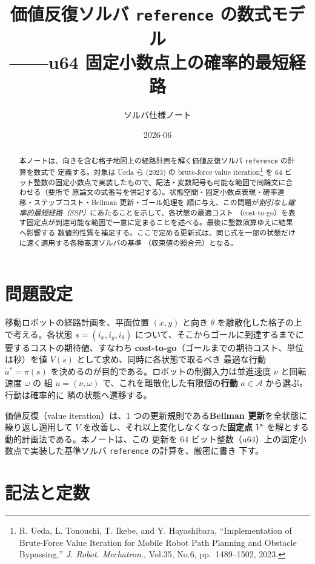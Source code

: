 \documentclass[11pt]{ltjsarticle}
\title{価値反復ソルバ \texttt{reference} の数式モデル\\\large——u64 固定小数点上の確率的最短経路}
\author{ソルバ仕様ノート}
\date{2026-06}
\begin{document}
\maketitle

\begin{abstract}
本ノートは、向きを含む格子地図上の経路計画を解く価値反復ソルバ \texttt{reference} の計算を数式で
定義する。対象は Ueda ら (2023) の brute-force value iteration\footnote{R. Ueda, L. Tonouchi, T. Ikebe,
and Y. Hayashibara, ``Implementation of Brute-Force Value Iteration for Mobile Robot Path Planning and
Obstacle Bypassing,'' \textit{J. Robot. Mechatron.}, Vol.35, No.6, pp.~1489--1502, 2023.}
を $64$ ビット整数の固定小数点で実装したもので、記法・変数記号も可能な範囲で同論文に合わせる（要所で
原論文の式番号を併記する）。状態空間・固定小数点表現・確率遷移・ステップコスト・Bellman 更新・ゴール処理を
順に与え、この問題が\emph{割引なし確率的最短経路（SSP）}にあたることを示して、各状態の最適コスト
（cost-to-go）を表す固定点が到達可能な範囲で一意に定まることを述べる。最後に整数演算ゆえに結果へ影響する
数値的性質を補足する。ここで定める更新式は、同じ式を一部の状態だけに速く適用する各種高速ソルバの基準
（収束値の照合元）となる。
\end{abstract}

\tableofcontents

\section{問題設定}
\label{sec:setup}

移動ロボットの経路計画を、平面位置 $(x,y)$ と向き $\theta$ を離散化した格子の上で考える。各状態
$s=(i_x,i_y,i_\theta)$ について、そこからゴールに到達するまでに要するコストの期待値、すなわち
\textbf{cost-to-go}（ゴールまでの期待コスト、単位は秒）を値 $V(s)$ として求め、同時に各状態で取るべき
最適な行動 $a^\ast=\pi(s)$ を決めるのが目的である。ロボットの制御入力は並進速度 $\nu$ と回転速度 $\omega$ の
組 $u=(\nu,\omega)$ で、これを離散化した有限個の\textbf{行動} $a\in\mathcal{A}$ から選ぶ。行動は確率的に
隣の状態へ遷移する。

価値反復（value iteration）は、$1$ つの更新規則である\textbf{Bellman 更新}を全状態に繰り返し適用して $V$
を改善し、それ以上変化しなくなった\textbf{固定点} $V^\star$ を解とする動的計画法である。本ノートは、この
更新を $64$ ビット整数（u64）上の固定小数点で実装した基準ソルバ \texttt{reference} の計算を、厳密に書き
下す。

\section{記法と定数}
\label{sec:notation}
\end{document}
